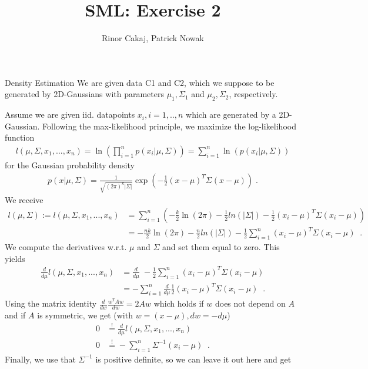 \documentclass[
ngerman,
]{tudaexercise}
\newcommand{\sni}{\sum_{i=1}^{n}}
\begin{document}
	
	\title[Uebung]{SML: Exercise 2}
	\author{Rinor Cakaj, Patrick Nowak}
	
	\maketitle
	
	\begin{task}{Density Estimation}
		We are given data C1 and C2, which we suppose to be generated by 2D-Gaussians with parameters ${\mu_1,\Sigma_1}$ and ${\mu_2,\Sigma_2}$, respectively.
		\begin{subtask}
			Assume we are given iid. datapoints $x_i, i=1,..,n$ which are generated by a 2D-Gaussian. Following the max-likelihood principle, we maximize the log-likelihood function
			\begin{align*}
				l(\mu,\Sigma,x_1,...,x_n)=\ln(\prod_{i=1}^n p(x_i|\mu,\Sigma))=\sni\ln(p(x_i|\mu,\Sigma))
			\end{align*}
			for the Gaussian probability density
			\begin{align} p(x|\mu,\Sigma)=\frac{1}{\sqrt{(2\pi)^k|\Sigma|}}\exp\left( -\frac{1}{2}(x-\mu)^T\Sigma(x-\mu)\right)\;.
			\end{align}
			We receive
			\begin{align}
			l(\mu,\Sigma):=l(\mu,\Sigma,x_1,...,x_n)&=\sni\left( -\frac{k}{2}\ln(2\pi)-\frac{1}{2}ln(|\Sigma|)-\frac{1}{2}(x_i-\mu)^T\Sigma(x_i-\mu)\right) \\
			&=-\frac{nk}{2}\ln(2\pi)-\frac{n}{2}ln(|\Sigma|)-\frac{1}{2}\sni (x_i-\mu)^T\Sigma(x_i-\mu)\;\;.\label{lfkt}
			\end{align}
			We compute the derivatives w.r.t. $\mu$ and $\Sigma$ and set them equal to zero. This yields
			\begin{align*}
\frac{d}{d\mu}l(\mu,\Sigma,x_1,...,x_n)&=\frac{d}{d\mu}\; -\frac{1}{2}\sni (x_i-\mu)^T\Sigma (x_i-\mu)\\ &= -\sni \frac{d}{d\mu}\frac{1}{2}(x_i-\mu)^T\Sigma (x_i-\mu)\;\;.
			\end{align*}
			Using the matrix identity $\frac{d}{dw}\frac{w^T Aw}{dw}=2Aw$ which holds if $w$ does not depend on $A$ and if $A$ is symmetric, we get (with $w=(x-\mu), dw=-d\mu$)
			\begin{align*}
			0&\stackrel{!}{=}\frac{d}{d\mu}l(\mu,\Sigma,x_1,...,x_n)\\
			0&\stackrel{!}{=}-\sni \Sigma^{-1}(x_i-\mu)	\;\;.
			\end{align*}
			Finally, we use that $\Sigma^{-1}$ is positive definite, so we can leave it out here and get

\end{subtask}
\end{task}
\end{document}
